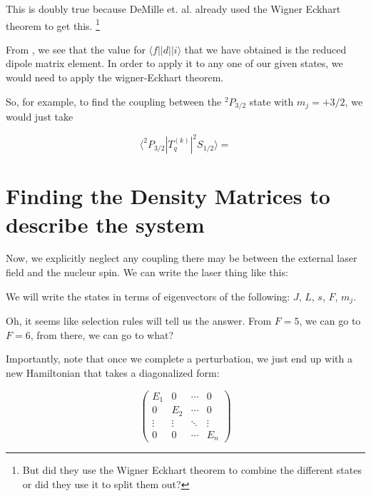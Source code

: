 This is doubly true because DeMille et. al. already used the Wigner Eckhart theorem to get this. \footnote{But did they use the Wigner Eckhart theorem to combine the different states or did they use it to split them out?} 

From \cite{demilleBudkerKimball}, we see that the value for $\langle f||d||i\rangle$ that we have obtained is the reduced dipole matrix element. In order to apply it to any one of our given states, we would need to apply the wigner-Eckhart theorem. 

So, for example, to find the coupling between the $^2 P_{3/2}$ state with $m_j=+3/2$, we would just take 

\begin{equation}
\langle ^2 P _{3/2}|T_q^{(k)}|^2 S_{1/2}\rangle = 
\end{equation}


\section{Finding the Density Matrices to describe the system}


Now, we explicitly neglect any coupling there may be between the external laser field and the nucleur spin. We can write the laser thing like this: 


We will write the states in terms of eigenvectors of the following: $J$, $L$, $s$, $F$, $m_j$.

Oh, it seems like selection rules will tell us the answer. From $F=5$, we can go to $F=6$, from there, we can go to what? 



Importantly, note that once we complete a perturbation, we just end up with a new Hamiltonian that takes a diagonalized form:

\begin{equation}
\begin{pmatrix}
E_1 & 0 & \cdots & 0 \\
0   & E_2 & \cdots & 0\\
\vdots&\vdots&\ddots & \vdots\\
0 & 0 & \cdots & E_n
\end{pmatrix}
\end{equation}

